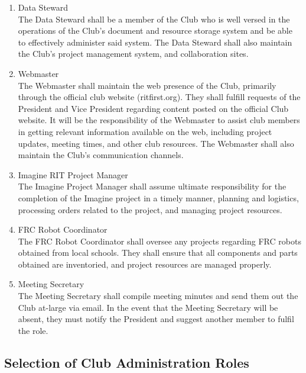 \documentclass[english,11pt]{article}
\begin{document}
\begin{enumerate}[label=\Alph*.]
    \item {\large Data Steward} \\
            The Data Steward shall be a member of the Club who is well versed in the operations of the Club's document and resource storage system and be able to effectively administer said system.
            The Data Steward shall also maintain the Club's project management system, and collaboration sites.
    \item {\large Webmaster} \\
            The Webmaster shall maintain the web presence of the Club, primarily through the official club website (ritfirst.org).
            They shall fulfill requests of the President and Vice President regarding content posted on the official Club website.
            It will be the responsibility of the Webmaster to assist club members in getting relevant information available on the web, including project updates, meeting times, and other club resources.
            The Webmaster shall also maintain the Club's communication channels.
    \item {\large Imagine RIT Project Manager} \\
            The Imagine Project Manager shall assume ultimate responsibility for the completion of the Imagine project in a timely manner, planning and logistics, processing orders related to the project, and managing project resources.
    \item {\large FRC Robot Coordinator} \\
            The FRC Robot Coordinator shall oversee any projects regarding FRC robots obtained from local schools.
            They shall ensure that all components and parts obtained are inventoried, and project resources are managed properly.
    \item {\large Meeting Secretary} \\
            The Meeting Secretary shall compile meeting minutes and send them out the Club at-large via email.
            In the event that the Meeting Secretary will be absent, they must notify the President and suggest another member to fulfil the role.
\end{enumerate}

\subsection{Selection of Club Administration Roles} \label{sect:cadmin:selection}
\end{document}
